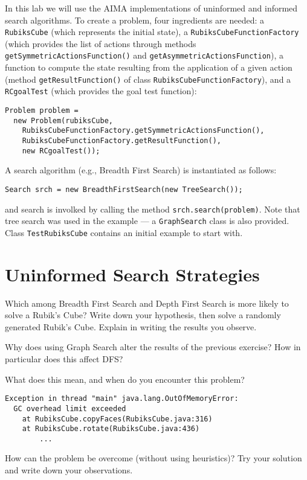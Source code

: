 \documentclass[a4paper]{article}
\begin{document}
In this lab we will use the AIMA implementations of uninformed and informed search algorithms.  To create a problem, four ingredients are needed: a {\tt RubiksCube} (which represents the initial state), a {\tt RubiksCubeFunctionFactory} (which provides the list of actions through methods {\tt getSymmetricActionsFunction()} and {\tt getAsymmetricActionsFunction}), a function to compute the state resulting from the application of a given action (method {\tt getResultFunction()} of class {\tt RubiksCubeFunctionFactory}), and a {\tt RCgoalTest} (which provides the goal test function):

\begin{lstlisting}
Problem problem =
  new Problem(rubiksCube,
    RubiksCubeFunctionFactory.getSymmetricActionsFunction(),
    RubiksCubeFunctionFactory.getResultFunction(),
    new RCgoalTest());
\end{lstlisting}

\noindent A search algorithm (e.g., Breadth First Search) is instantiated as follows:

\begin{lstlisting}
Search srch = new BreadthFirstSearch(new TreeSearch());
\end{lstlisting}

\noindent and search is involked by calling the method {\tt srch.search(problem)}.  Note that tree search was used in the example --- a {\tt GraphSearch} class is also provided.  Class {\tt TestRubiksCube} contains an initial example to start with.

\section{Uninformed Search Strategies}

{\ex{}\label{ex:ex1} Which among Breadth First Search and Depth First Search is more likely to solve a Rubik's Cube?  Write down your hypothesis, then solve a randomly generated Rubik's Cube.  Explain in writing the results you observe.\vspace{0.1cm}}

{\ex{}\label{ex:ex2} Why does using Graph Search alter the results of the previous exercise?  How in particular does this affect DFS?\vspace{0.1cm}}

{\ex{}\label{ex:ex3} What does this mean, and when do you encounter this problem?  
\begin{lstlisting}
Exception in thread "main" java.lang.OutOfMemoryError:
  GC overhead limit exceeded
    at RubiksCube.copyFaces(RubiksCube.java:316)
    at RubiksCube.rotate(RubiksCube.java:436)
        ...
\end{lstlisting}
How can the problem be overcome (without using heuristics)?  Try your solution and write down your observations.
\vspace{0.1cm}}
\end{document}
